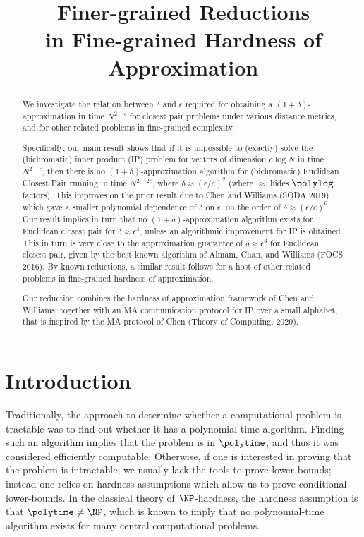 \documentclass[11pt]{article}
\title{Finer-grained Reductions \\ in Fine-grained Hardness of Approximation}
\author{
Elie Abboud {\hskip 5em\relax}
Noga Ron-Zewi\thanks{Research of both authors supported in part
    by ISF grant 735/20 and by the European Union (ERC, ECCC, 101076663). Views and opinions expressed are however those of the author(s) only and do not necessarily reflect those of the European Union or the European Research Council. Neither the European Union nor the granting authority can be held responsible for them.} \\ 
Department of Computer Science, University of Haifa \\ \texttt{}\qquad  \texttt{eliabboud1000@gmail.com, noga@cs.haifa.ac.il}
}
\date{}
\begin{document}
 
\maketitle

\begin{abstract}

We investigate the relation between $\delta$ and $\epsilon$ required for obtaining a $(1+\delta)$-approximation in time $N^{2-\epsilon}$ for closest pair problems under various distance metrics, and for other related problems in fine-grained complexity. 

Specifically, our main result shows that  if it is impossible to (exactly) solve the  (bichromatic) inner product (IP) problem for vectors of dimension $c \log N$ in time $N^{2-\epsilon}$, then there is no 
$(1+\delta)$-approximation algorithm for (bichromatic) Euclidean Closest Pair running in time $N^{2-2\epsilon}$, where 
$\delta \approx (\epsilon/c)^2$ (where $\approx$ hides $\polylog$ factors). This improves on the prior result due to Chen and Williams (SODA 2019) which gave a smaller polynomial dependence  of $\delta$ on $\epsilon$, on the order of $\delta \approx (\epsilon/c)^6$.
Our result implies in turn that no $(1+\delta)$-approximation algorithm exists for Euclidean closest pair for $\delta \approx \epsilon^4$,  unless an algorithmic improvement for IP is obtained. This in turn is  very close to the  approximation guarantee of $\delta \approx \epsilon^3$ for  Euclidean closest pair, given by the best known algorithm of Almam, Chan, and Williams (FOCS 2016).
By known reductions, a similar result follows for a host of other related problems in fine-grained hardness of approximation. 

Our reduction combines the hardness of approximation framework of Chen and Williams, together with an MA communication protocol for IP over a small alphabet, that is inspired by the MA protocol of Chen (Theory of Computing, 2020).
\end{abstract}

\section{Introduction}\label{sec:intro}



Traditionally, the approach to determine whether a computational problem is tractable was to find out whether
it has a polynomial-time algorithm. Finding such an algorithm implies that the problem is in $\polytime$,
and thus it was considered efficiently computable. Otherwise, if one is interested
in proving that the problem is intractable, we usually lack
the tools to prove lower bounds; instead one relies on hardness assumptions 
which allow us to prove conditional lower-bounds. 
In the classical theory of $\NP$-hardness, the hardness assumption is that $\polytime \neq \NP$, which is known to imply that no polynomial-time algorithm exists for many central computational problems.
\end{document}
